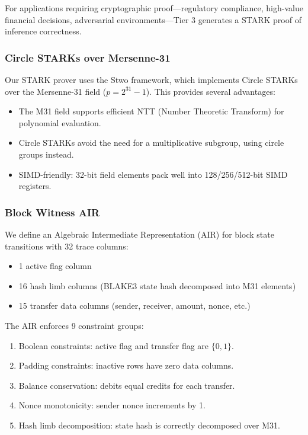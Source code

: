 \documentclass[conference]{IEEEtran}
\begin{document}
For applications requiring cryptographic proof---regulatory compliance, high-value financial decisions, adversarial environments---Tier 3 generates a STARK proof of inference correctness.

\subsubsection{Circle STARKs over Mersenne-31}

Our STARK prover uses the Stwo framework, which implements Circle STARKs over the Mersenne-31 field ($p = 2^{31} - 1$). This provides several advantages:
\begin{itemize}
    \item The M31 field supports efficient NTT (Number Theoretic Transform) for polynomial evaluation.
    \item Circle STARKs avoid the need for a multiplicative subgroup, using circle groups instead.
    \item SIMD-friendly: 32-bit field elements pack well into 128/256/512-bit SIMD registers.
\end{itemize}

\subsubsection{Block Witness AIR}

We define an Algebraic Intermediate Representation (AIR) for block state transitions with 32 trace columns:
\begin{itemize}
    \item 1 active flag column
    \item 16 hash limb columns (BLAKE3 state hash decomposed into M31 elements)
    \item 15 transfer data columns (sender, receiver, amount, nonce, etc.)
\end{itemize}

The AIR enforces 9 constraint groups:
\begin{enumerate}
    \item Boolean constraints: active flag and transfer flag are $\{0, 1\}$.
    \item Padding constraints: inactive rows have zero data columns.
    \item Balance conservation: debits equal credits for each transfer.
    \item Nonce monotonicity: sender nonce increments by 1.
    \item Hash limb decomposition: state hash is correctly decomposed over M31.
\end{enumerate}
\end{document}
